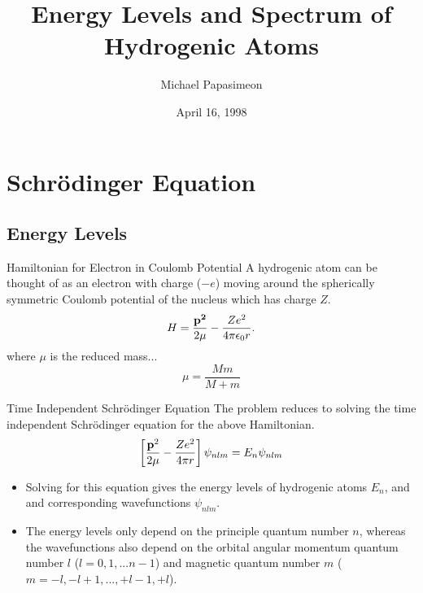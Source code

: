 \documentclass[xcolor=dvipsnames,t]{beamer}
\title[Hydrogenic Atoms]{Energy Levels and Spectrum of Hydrogenic Atoms}
\author{ Michael Papasimeon} %
\date{April 16, 1998}
\begin{document}
\begin{frame}
    \maketitle
\end{frame} 

\section{Schr\"odinger Equation}

    \subsection{Energy Levels}
    \begin{frame}{Hamiltonian for Electron in Coulomb Potential} 
        A hydrogenic atom can be thought of as an electron with charge ($-e$)
        moving around the spherically symmetric Coulomb potential of the
        nucleus which has charge $Z$. 
        \begin{equation} 
            H = \frac{\bf{p}^2}{2\mu} - \frac{Ze^2}{4 \pi \epsilon_0 r}.
        \end{equation} 
        where $\mu$ is the reduced mass...
        \begin{equation}
            \mu = \frac{Mm}{M + m}
        \end{equation}
    \end{frame} 

    \begin{frame}{Time Independent Schr\"odinger Equation} 
    The problem reduces to solving the time independent Schr\"odinger equation
    for the above Hamiltonian.
    \begin{equation}
    \left[ \frac{{\bf p}^2}{2\mu} - \frac{Ze^2}{4 \pi r}\right] \psi_{nlm} = E_n \psi_{nlm} 
    \end{equation}
    
    \begin{itemize} 
        \item Solving for this equation gives the energy levels of hydrogenic atoms $E_n$, and 
              and corresponding wavefunctions $\psi_{nlm}$. 
        \item The energy levels only depend on the
              principle quantum number $n$, whereas the wavefunctions also depend on the 
              orbital angular momentum quantum number $l$ ($l = 0, 1, ... n - 1$) and 
              magnetic quantum number $m$ ($m = -l, -l + 1, ... , +l - 1, +l$).
    \end{itemize} 
    \end{frame} 
\end{document}
